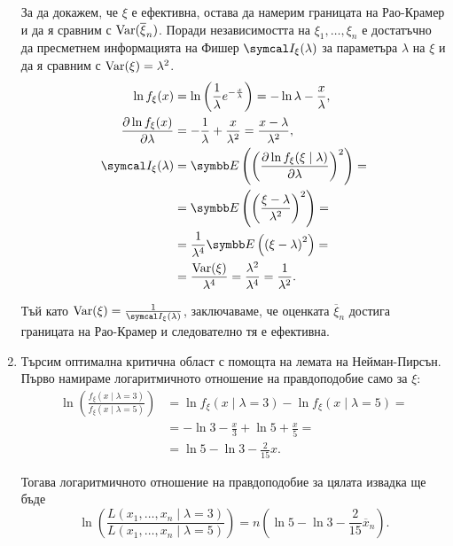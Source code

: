 \documentclass[numbers=endperiod, bibliography=totocnumbered]{scrartcl}
\begin{document}
\begin{solution}
\begin{enumerate}[label=\alph*)]
    За да докажем, че \( \xi \) е ефективна, остава да намерим границата на Рао-Крамер и да я сравним с \( \operatorname{Var}(\overline \xi_n) \). Поради независимостта на \( \xi_1, \ldots, \xi_n \) е достатъчно да пресметнем информацията на Фишер \( \FisherInfo_\xi(\lambda) \) за параметъра \( \lambda \) на \( \xi \) и да я сравним с \( \operatorname{Var}(\xi) = \lambda^2 \).
    \begin{align*}
      \ln f_\xi(x)
      &=
      \ln \left(\frac 1 \lambda e^{-\frac x \lambda} \right)
      =
      -\ln \lambda -\frac x \lambda,
      \\
      \frac {\partial \ln f_\xi(x)} {\partial \lambda}
      &=
      -\frac 1 \lambda + \frac x {\lambda^2}
      =
      \frac {x - \lambda} {\lambda^2},
      \\
      \FisherInfo_\xi(\lambda)
      &=
      \Expect \left( {\left( \frac {\partial \ln f_\xi(\xi \mid \lambda)} {\partial \lambda} \right)}^2 \right)
      = \\ &=
      \Expect \left( {\left( \frac {\xi - \lambda} {\lambda^2} \right)}^2 \right)
      = \\ &=
      \frac 1 {\lambda^4} \Expect \left( {({\xi - \lambda})}^2 \right)
      = \\ &=
      \frac {\Var(\xi)} {\lambda^4}
      =
      \frac {\lambda^2} {\lambda^4}
      =
      \frac 1 {\lambda^2}.
    \end{align*}

    Тъй като \( \Var(\xi) = \frac 1 {\FisherInfo_\xi(\lambda)} \), заключаваме, че оценката \( \overline \xi_n \) достига границата на Рао-Крамер и следователно тя е ефективна.

    \item Търсим оптимална критична област с помощта на лемата на Нейман-Пирсън. Първо намираме логаритмичното отношение на правдоподобие само за \( \xi \):
    \begin{align*}
      \ln \left(\frac {f_\xi(x \mid \lambda=3)} {f_\xi(x \mid \lambda=5)} \right)
      &=
      \ln f_\xi(x \mid \lambda=3) - \ln f_\xi(x \mid \lambda=5)
      = \\ &=
      - \ln 3 - \frac x 3 + \ln 5 + \frac x 5
      = \\ &=
      \ln 5 - \ln 3 - \frac 2 {15} x.
    \end{align*}

    Тогава логаритмичното отношение на правдоподобие за цялата извадка ще бъде
    \begin{equation*}
      \ln \left(\frac {L(x_1, \ldots, x_n \mid \lambda=3)} {L(x_1, \ldots, x_n \mid \lambda=5)} \right)
      =
      n \left(\ln 5 - \ln 3 - \frac 2 {15} \overline x_n \right).
    \end{equation*}


\end{enumerate}
\end{solution}
\end{document}
